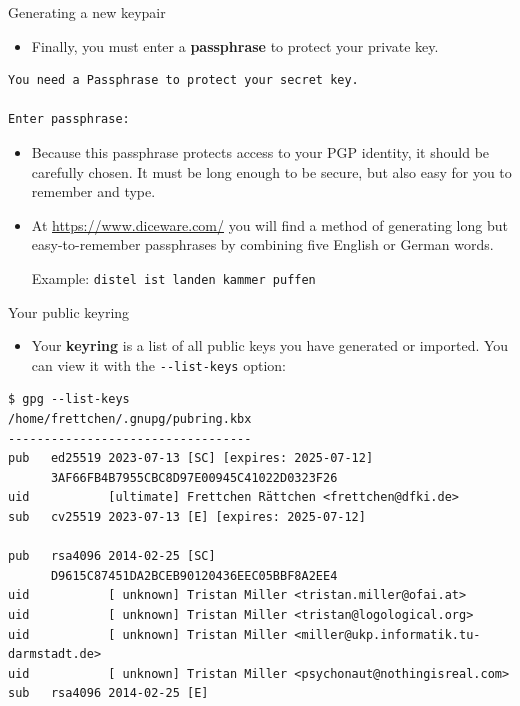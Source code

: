\documentclass[
mode=present,
paper=smartboard,
size=20pt,
]{powerdot}
\newcommand\vsp{\vspace{-16mm}}
\newcommand{\clopt}[1]{\texttt{{-}#1}}
\begin{document}
\begin{slide}[method=direct,toc=]{Generating a new keypair}
  \begin{itemize}
  \item Finally, you must enter a \textbf{passphrase} to protect your
    private key.
  \end{itemize}
\vsp
\begin{verbatim}
You need a Passphrase to protect your secret key.    

Enter passphrase: 
\end{verbatim}

  \begin{itemize}
  \item Because this passphrase protects access to your PGP identity, it
    should be carefully chosen.  It must be long enough to be secure,
    but also easy for you to remember and type.
  \item At \url{https://www.diceware.com/} you will find a method of
    generating long but easy-to-remember passphrases by combining five
    English or German words.

    Example: \texttt{distel ist landen kammer puffen}
  \end{itemize}
\end{slide}

\begin{slide}[method=direct]{Your public keyring}
  \begin{itemize}
  \item Your \textbf{keyring} is a list of all public keys you have
    generated or imported.  You can view it with the
    \clopt{-list-keys} option:
  \end{itemize}
\vsp
\begin{verbatim}
$ gpg --list-keys
/home/frettchen/.gnupg/pubring.kbx
----------------------------------
pub   ed25519 2023-07-13 [SC] [expires: 2025-07-12]
      3AF66FB4B7955CBC8D97E00945C41022D0323F26
uid           [ultimate] Frettchen Rättchen <frettchen@dfki.de>
sub   cv25519 2023-07-13 [E] [expires: 2025-07-12]

pub   rsa4096 2014-02-25 [SC]
      D9615C87451DA2BCEB90120436EEC05BBF8A2EE4
uid           [ unknown] Tristan Miller <tristan.miller@ofai.at>
uid           [ unknown] Tristan Miller <tristan@logological.org>
uid           [ unknown] Tristan Miller <miller@ukp.informatik.tu-darmstadt.de>
uid           [ unknown] Tristan Miller <psychonaut@nothingisreal.com>
sub   rsa4096 2014-02-25 [E]
\end{verbatim}
\end{slide}
\end{document}
